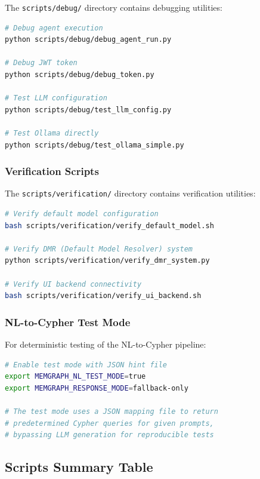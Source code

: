 The \texttt{scripts/debug/} directory contains debugging utilities:

\begin{lstlisting}[language=bash, caption=Debug scripts]
# Debug agent execution
python scripts/debug/debug_agent_run.py

# Debug JWT token
python scripts/debug/debug_token.py

# Test LLM configuration
python scripts/debug/test_llm_config.py

# Test Ollama directly
python scripts/debug/test_ollama_simple.py
\end{lstlisting}

\subsubsection{Verification Scripts}

The \texttt{scripts/verification/} directory contains verification utilities:

\begin{lstlisting}[language=bash, caption=Verification scripts]
# Verify default model configuration
bash scripts/verification/verify_default_model.sh

# Verify DMR (Default Model Resolver) system
python scripts/verification/verify_dmr_system.py

# Verify UI backend connectivity
bash scripts/verification/verify_ui_backend.sh
\end{lstlisting}

\subsubsection{NL-to-Cypher Test Mode}

For deterministic testing of the NL-to-Cypher pipeline:

\begin{lstlisting}[language=bash, caption=Enabling NL-to-Cypher test mode]
# Enable test mode with JSON hint file
export MEMGRAPH_NL_TEST_MODE=true
export MEMGRAPH_RESPONSE_MODE=fallback-only

# The test mode uses a JSON mapping file to return
# predetermined Cypher queries for given prompts,
# bypassing LLM generation for reproducible tests
\end{lstlisting}

\subsection{Scripts Summary Table}

